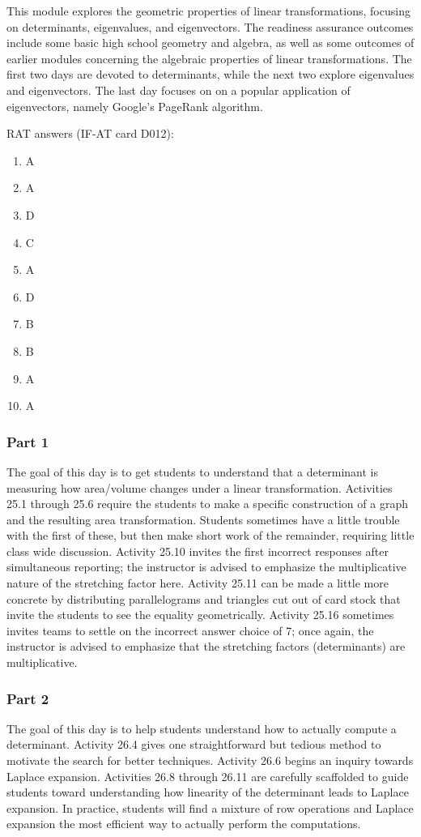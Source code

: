\documentclass{article}
\begin{document}
This module explores the geometric properties of linear transformations, focusing on determinants, eigenvalues, and eigenvectors.  The readiness assurance outcomes include some basic high school geometry and algebra, as well as some outcomes of earlier modules concerning the algebraic properties of linear transformations.  The first two days are devoted to determinants, while the next two explore eigenvalues and eigenvectors.  The last day focuses on on a popular application of eigenvectors, namely Google's PageRank algorithm.

RAT answers (IF-AT card D012):
\begin{multicols}{10}
\begin{enumerate}[1)]
\item A
\item A
\item D
\item C
\item A
\item D
\item B
\item B
\item A
\item A
\end{enumerate}
\end{multicols}

\subsubsection*{Part 1}
The goal of this day is to get students to understand that a determinant is measuring how area/volume changes under a linear transformation.  Activities 25.1 through 25.6 require the students to make a specific construction of a graph and the resulting area transformation.  Students sometimes have a little trouble with the first of these, but then make short work of the remainder, requiring little class wide discussion.  Activity 25.10 invites the first incorrect responses after simultaneous reporting; the instructor is advised to emphasize the multiplicative nature of the stretching factor here.  Activity 25.11 can be made a little more concrete by distributing parallelograms and triangles cut out of card stock that invite the students to see the equality geometrically.  Activity 25.16 sometimes invites teams to settle on the incorrect answer choice of 7; once again, the instructor is advised to emphasize that the stretching factors (determinants) are multiplicative.

\subsubsection*{Part 2}
The goal of this day is to help students understand how to actually compute a determinant.  Activity 26.4 gives one straightforward but tedious method to motivate the search for better techniques.  Activity 26.6 begins an inquiry towards Laplace expansion.  Activities 26.8 through 26.11 are carefully scaffolded to guide students toward understanding how linearity of the determinant leads to Laplace expansion.  In practice, students will find a mixture of row operations and Laplace expansion the most efficient way to actually perform the computations.
\end{document}
